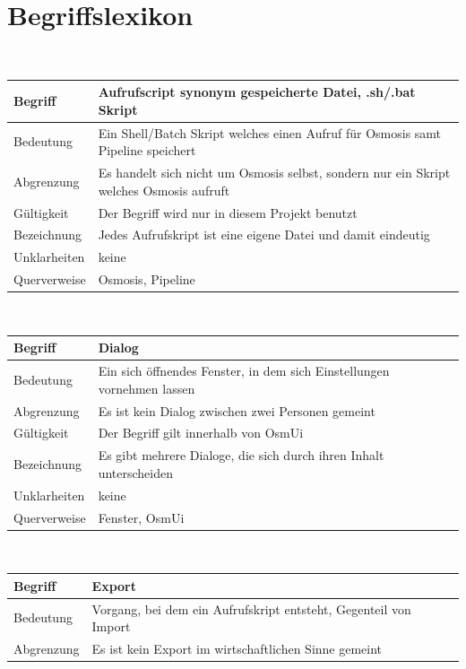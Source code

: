 \documentclass[a4paper,12pt]{scrartcl}
\begin{document}
\section{Begriffslexikon}
\begin{center}
\ \\
\begin{tabular}{|p{5cm}|p{10cm}|}
\hline Begriff & \textbf{Aufrufscript} synonym gespeicherte Datei, .sh/.bat Skript\\ 
\hline Bedeutung & Ein Shell/Batch Skript welches einen Aufruf für Osmosis samt Pipeline speichert \\
\hline Abgrenzung & Es handelt sich nicht um Osmosis selbst, sondern nur ein Skript welches Osmosis aufruft \\ 
\hline Gültigkeit &  Der Begriff wird nur in diesem Projekt benutzt \\ 
\hline Bezeichnung &  Jedes Aufrufskript ist eine eigene Datei und damit eindeutig\\ 
\hline Unklarheiten &  keine \\ 
\hline Querverweise &  Osmosis, Pipeline\\ 
\hline 
\end{tabular}
\vspace{0.7cm}
\\
\begin{tabular}{|p{5cm}|p{10cm}|}
\hline Begriff & \textbf{Dialog}\\ 
\hline Bedeutung & Ein sich öffnendes Fenster, in dem sich Einstellungen vornehmen lassen \\ 
\hline Abgrenzung & Es ist kein Dialog zwischen zwei Personen gemeint\\ 
\hline Gültigkeit & Der Begriff gilt innerhalb von OsmUi \\ 
\hline Bezeichnung & Es gibt mehrere Dialoge, die sich durch ihren Inhalt unterscheiden \\ 
\hline Unklarheiten & keine \\ 
\hline Querverweise & Fenster, OsmUi \\ 
\hline
\end{tabular}
\vspace{0.7cm}
\\
\begin{tabular}{|p{5cm}|p{10cm}|}
\hline Begriff & \textbf{Export}\\
\hline Bedeutung & Vorgang, bei dem ein Aufrufskript entsteht, Gegenteil von Import \\ 
\hline Abgrenzung & Es ist kein Export im wirtschaftlichen  Sinne gemeint\\ 

\end{tabular}
\end{center}
\end{document}
